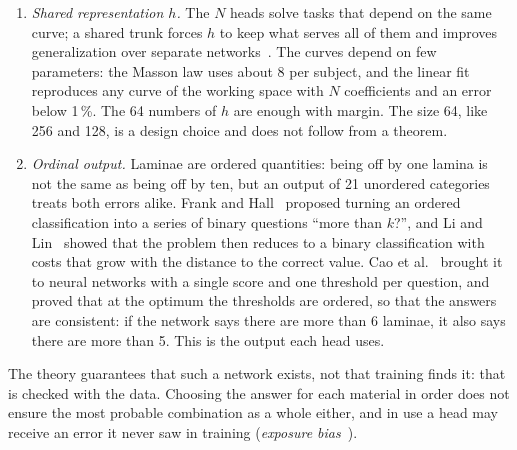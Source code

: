 \begin{enumerate}[label=(\alph*)]
\item \emph{Shared representation $h$.} The $N$ heads solve tasks that depend on the same curve; a shared trunk forces $h$ to keep what serves all of them and improves generalization over separate networks~\cite{caruana,bengio13}. The curves depend on few parameters: the Masson law uses about 8 per subject, and the linear fit reproduces any curve of the working space with $N$ coefficients and an error below 1\,\%. The 64 numbers of $h$ are enough with margin. The size 64, like 256 and 128, is a design choice and does not follow from a theorem.
\item \emph{Ordinal output.} Laminae are ordered quantities: being off by one lamina is not the same as being off by ten, but an output of 21 unordered categories treats both errors alike. Frank and Hall~\cite{frankhall} proposed turning an ordered classification into a series of binary questions ``more than $k$?'', and Li and Lin~\cite{lilin} showed that the problem then reduces to a binary classification with costs that grow with the distance to the correct value. Cao et al.~\cite{cao} brought it to neural networks with a single score and one threshold per question, and proved that at the optimum the thresholds are ordered, so that the answers are consistent: if the network says there are more than 6 laminae, it also says there are more than 5. This is the output each head uses.
\end{enumerate}
The theory guarantees that such a network exists, not that training finds it: that is checked with the data. Choosing the answer for each material in order does not ensure the most probable combination as a whole either, and in use a head may receive an error it never saw in training (\emph{exposure bias}~\cite{bengio15}).

